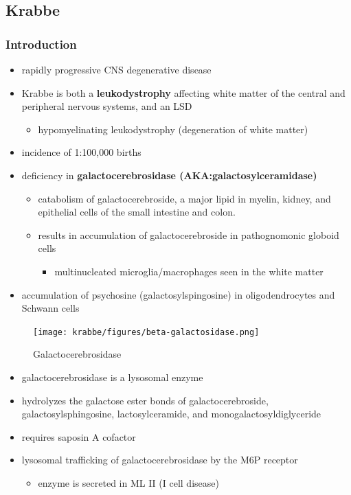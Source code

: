 \documentclass[12pt]{scrartcl}
\begin{document}
\subsection{Krabbe}
\label{sec:orga443db4}
\subsubsection{Introduction}
\label{sec:org8a923ef}
\begin{itemize}
\item rapidly progressive CNS degenerative disease
\item Krabbe is both a \textbf{leukodystrophy} affecting white matter of the central
and peripheral nervous systems, and an LSD
\begin{itemize}
\item hypomyelinating leukodystrophy (degeneration of white matter)
\end{itemize}
\item incidence of 1:100,000 births
\item deficiency in \textbf{galactocerebrosidase (AKA:galactosylceramidase)} 
\begin{itemize}
\item catabolism of galactocerebroside, a major lipid in myelin, kidney, and epithelial cells of the small intestine and colon.
\item results in accumulation of galactocerebroside in pathognomonic globoid cells
\begin{itemize}
\item multinucleated microglia/macrophages seen in the white matter
\end{itemize}
\end{itemize}
\item accumulation of psychosine (galactosylspingosine) in oligodendrocytes and Schwann cells
\end{itemize}

\begin{figure}[htbp]
\centering
\texttt{[image: krabbe/figures/beta-galactosidase.png]}
\caption{\label{fig:org7060794}Galactocerebrosidase}
\end{figure}

\begin{itemize}
\item galactocerebrosidase is a lysosomal enzyme
\item hydrolyzes the galactose ester bonds of galactocerebroside, galactosylsphingosine, lactosylceramide, and monogalactosyldiglyceride
\item requires saposin A cofactor
\item lysosomal trafficking of galactocerebrosidase by the M6P receptor
\begin{itemize}
\item enzyme is secreted in ML II (I cell disease)
\end{itemize}
\end{itemize}
\end{document}
